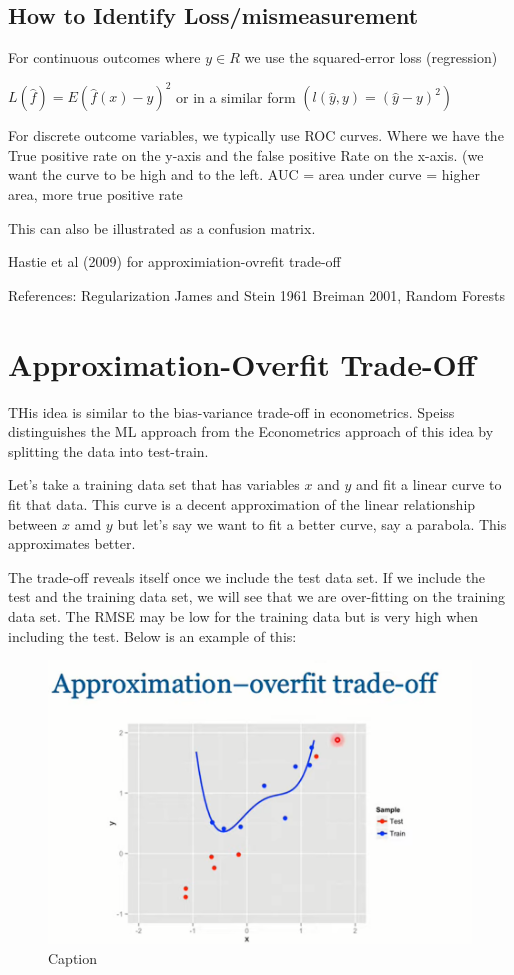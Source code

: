 \documentclass{article}
\begin{document}
\subsection{How to Identify Loss/mismeasurement}

For continuous outcomes where $y \in R$ we use the squared-error loss (regression)

$L(\hat{f}) = E (\hat{f}(x) - y)^2$ or in a similar form $(l(\hat{y},y) = (\hat{y} - y)^2)$

For discrete outcome variables, we typically use ROC curves. Where we have the True positive rate on the y-axis and the false positive Rate on the x-axis. (we want the curve to be high and to the left. AUC = area under curve = higher area, more true positive rate

This can also be illustrated as a confusion matrix.



Hastie et al (2009) for approximiation-ovrefit trade-off

References: Regularization James and Stein 1961
Breiman 2001, Random Forests

\section{Approximation-Overfit Trade-Off}

THis idea is similar to the bias-variance trade-off in econometrics. Speiss distinguishes the ML approach from the Econometrics approach of this idea by splitting the data into test-train. 

Let's take a training data set that has variables $x$ and $y$ and fit a linear curve to fit that data. This curve is a decent approximation of the linear relationship between $x$ amd $y$ but let's say we want to fit a better curve, say a parabola. This approximates better. 

The trade-off reveals itself once we include the test data set. If we include the test and the training data set, we will see that we are over-fitting on the training data set. The RMSE may be low for the training data but is very high when including the test. Below is an example of this:


\begin{figure}[H]
    \centering
    \includegraphics[scale =0.5]{approx_overfit.png}
    \caption{Caption}
    \label{fig:bias}
\end{figure}
\end{document}
